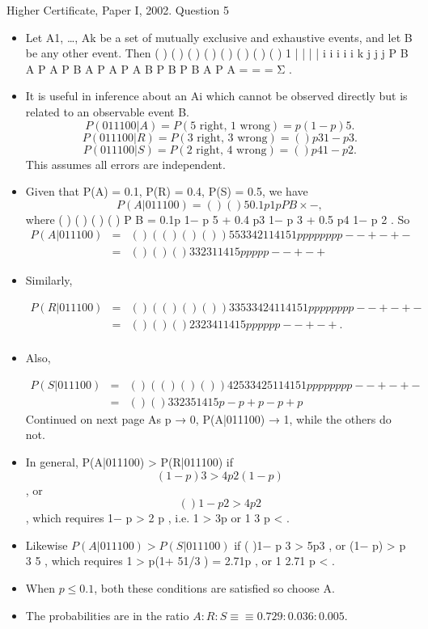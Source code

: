 \documentclass[a4paper,12pt]{article}
\begin{document}
Higher Certificate, Paper I, 2002. Question 5
\begin{itemize}
\item Let A1, …, Ak be a set of mutually exclusive and exhaustive events, and let B be any
other event.
Then ( ) ( ) ( )
( )
( ) ( )
( ) ( )
1
| |
|
|
i i i i
i k
j j
j
P B A P A P B A P A
P A B
P B P B A P A
=
= =
Σ
.
\item It is useful in inference about an Ai which cannot be observed directly but is related to
an observable event B.
\[P(011100|A) = P(\mbox{5 right, 1 wrong}) = p(1− p)5 .\]
\[P(011100|R) = P(\mbox{3 right, 3 wrong}) = ( )p3 1− p 3 .\]
\[P(011100|S) = P(\mbox{2 right, 4 wrong}) = ( )p4 1− p 2 .\]
This assumes all errors are independent.
\item Given that P(A) = 0.1, P(R) = 0.4, P(S) = 0.5, we have 
\[P(A|011100) = ( )
( )
5 0.1 p 1 p
P B
× −
,\]
where ( ) ( ) ( ) ( ) P B = 0.1p 1− p 5 + 0.4 p3 1− p 3 + 0.5 p4 1− p 2 .
So
\begin{eqnarray*}
P(A|011100) &=& ( )
( ( ) ( ) ( ) )
5
5 3 3 4 2
1
1 4 1 5 1
p p
p p p p p p
−
− + − + −
\\ &=&  ( )
( ) ( )
3
3 2 3
1
1 4 1 5
p
p p p p
−
− + − +
\end{eqnarray*}
\item Similarly, 

\begin{eqnarray*}
P(R|011100) &=& ( )
( ( ) ( ) ( ) )
3 3
5 3 3 4 2
4 1
1 4 1 5 1
p p
p p p p p p
−
− + − + −
\\ &=& ( )
( ) ( )
2
3 2 3
4 1
1 4 1 5
p p
p p p p
−
− + − +
.\\
\end{eqnarray*}
\item Also, 

\begin{eqnarray*}
P(S|011100) &=& ( )
( ( ) ( ) ( ) )
4 2
5 3 3 4 2
5 1
1 4 1 5 1
p p
p p p p p p
−
− + − + −
\\&=&
( ) ( )
3
3 2 3
5
1 4 1 5
p
− p + p − p + p
\end{eqnarray*}
Continued on next page
As p → 0, P(A|011100) → 1, while the others do not.
\item In general, P(A|011100) > P(R|011100) if \[(1− p)3 > 4 p2 (1− p) \], or 
\[( )1− p 2 > 4 p2\] ,
which requires 1− p > 2 p , i.e. 1 > 3p or 1
3 p < .
\item Likewise $P(A|011100) > P(S|011100)$ if ( )1− p 3 > 5p3 , or (1− p) > p 3 5 , which
requires 1 > p(1+ 51/3 ) = 2.71p , or 1
2.71
p < .
\item When $p \leq 0.1$, both these conditions are satisfied so choose A.
\item The probabilities are in the ratio $A:R:S \equiv≡ 0.729 : 0.036 : 0.005.$
\end{itemize}
\end{document}
